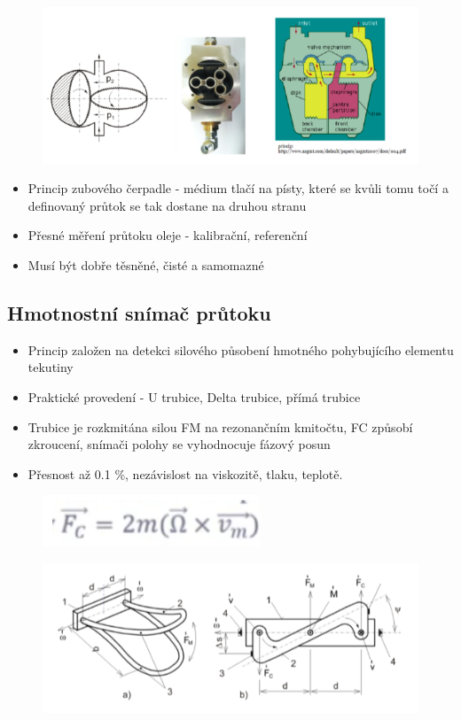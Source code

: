 \begin{figure}[h]
    \centering
    \includegraphics[scale = 1]{img/davkovaci.png}
\end{figure}
\newpage
\begin{itemize}
    \item Princip zubového čerpadle - médium tlačí na písty, které se kvůli tomu točí a definovaný průtok se tak dostane na druhou stranu
    \item Přesné měření průtoku oleje - kalibrační, referenční
    \item Musí být dobře těsněné, čisté a samomazné
\end{itemize}

\subsection*{Hmotnostní snímač průtoku}
\begin{itemize}
    \item Princip založen na detekci silového působení hmotného pohybujícího elementu tekutiny
    \item Praktické provedení - U trubice, Delta trubice, přímá trubice
    \item Trubice je rozkmitána silou FM na rezonančním kmitočtu, FC způsobí zkroucení, snímači polohy se vyhodnocuje fázový posun
    \item Přesnost až 0.1 \%, nezávislost na viskozitě, tlaku, teplotě.
\end{itemize}

\begin{figure}[h]
    \centering
    \includegraphics[scale = 1]{img/FC.png}
\end{figure}

\begin{figure}[h]
    \centering
    \includegraphics[scale = 1]{img/hmotnostniprutok.png}
\end{figure}

